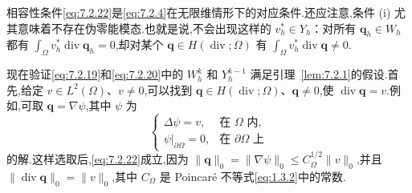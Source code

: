 相容性条件\eqref{eq:7.2.22}是\eqref{eq:7.2.4}在无限维情形下的对应条件.还应注意,条件 (i) 尤其意味着不存在伪零能模态.也就是说,不会出现这样的 \(v_h^*\in Y_h\)：对所有 \(\boldsymbol{q}_h\in W_h\) 都有 \(\int_\Omega v_h^*\operatorname{div}\boldsymbol{q}_h=0\),却对某个 \(\boldsymbol{q}\in H(\operatorname{div};\Omega)\) 有 \(\int_\Omega v_h^*\operatorname{div}\boldsymbol{q}\ne0\).

现在验证\eqref{eq:7.2.19}和\eqref{eq:7.2.20}中的 \(W_h^k\) 和 \(Y_h^{k-1}\) 满足引理~\ref{lem:7.2.1}的假设.首先,给定 \(v\in L^2(\Omega)\)、\(v\ne0\),可以找到 \(\boldsymbol{q}\in H(\operatorname{div};\Omega)\)、\(\boldsymbol{q}\ne0\),使 \(\operatorname{div}\boldsymbol{q}=v\).例如,可取 \(\boldsymbol{q}=\nabla\psi\),其中 \(\psi\) 为
\[
  \begin{cases}
    \Delta\psi=v,&\text{在 }\Omega\text{ 内},\\
    \psi|_{\partial\Omega}=0,&\text{在 }\partial\Omega\text{ 上}
  \end{cases}
\]
的解.这样选取后,\eqref{eq:7.2.22}成立,因为 \(\|\boldsymbol{q}\|_0=\|\nabla\psi\|_0\le C_\Omega^{1/2}\|v\|_0\),并且 \(\|\operatorname{div}\boldsymbol{q}\|_0=\|v\|_0\),其中 \(C_\Omega\) 是 Poincaré 不等式\eqref{eq:1.3.2}中的常数.

